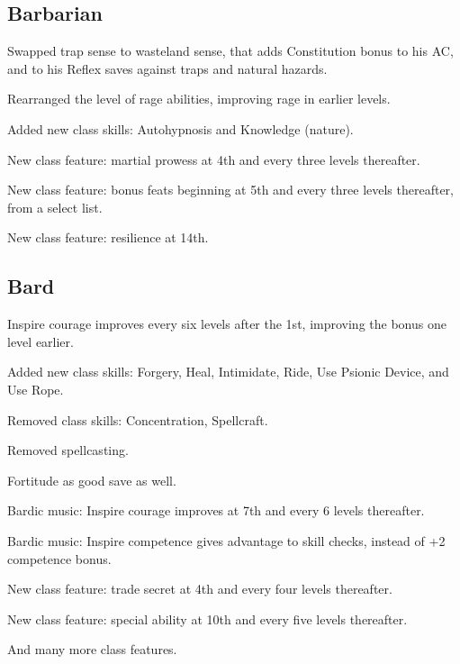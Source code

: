 \subsection{Barbarian}
\begin{itemize*}
\item Swapped trap sense to wasteland sense, that adds Constitution bonus to his AC, and to his Reflex saves against traps and natural hazards.
\item Rearranged the level of rage abilities, improving rage in earlier levels.
\item Added new class skills: Autohypnosis and Knowledge (nature).
\item New class feature: martial prowess at 4th and every three levels thereafter.
\item New class feature: bonus feats beginning at 5th and every three levels thereafter, from a select list.
\item New class feature: resilience at 14th.
\end{itemize*}

\subsection{Bard}
\begin{itemize*}
\item Inspire courage improves every six levels after the 1st, improving the bonus one level earlier.
\item Added new class skills: Forgery, Heal, Intimidate, Ride, Use Psionic Device, and Use Rope.
\item Removed class skills: Concentration, Spellcraft.
\item Removed spellcasting.
\item Fortitude as good save as well.
\item Bardic music: Inspire courage improves at 7th and every 6 levels thereafter.
\item Bardic music: Inspire competence gives advantage to skill checks, instead of +2 competence bonus.
\item New class feature: trade secret at 4th and every four levels thereafter.
\item New class feature: special ability at 10th and every five levels thereafter.
\item And many more class features.
\end{itemize*}

